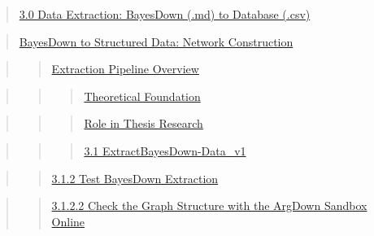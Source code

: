 \documentclass[
  11pt,
  letterpaper,
]{book}
\begin{document}
\begin{quote}
\hyperref[scrollTo=vUSS00TCEpeW]{3.0 Data Extraction: BayesDown (.md) to
Database (.csv)}
\end{quote}

\begin{quote}
\hyperref[scrollTo=vUSS00TCEpeW]{BayesDown to Structured Data: Network
Construction}
\end{quote}

\begin{quote}
\begin{quote}
\hyperref[scrollTo=vUSS00TCEpeW]{Extraction Pipeline Overview}
\end{quote}
\end{quote}

\begin{quote}
\begin{quote}
\begin{quote}
\hyperref[scrollTo=vUSS00TCEpeW]{Theoretical Foundation}
\end{quote}
\end{quote}
\end{quote}

\begin{quote}
\begin{quote}
\begin{quote}
\hyperref[scrollTo=vUSS00TCEpeW]{Role in Thesis Research}
\end{quote}
\end{quote}
\end{quote}

\begin{quote}
\begin{quote}
\begin{quote}
\hyperref[scrollTo=AFnu_1Ludahi]{3.1 ExtractBayesDown-Data\_v1}
\end{quote}
\end{quote}
\end{quote}

\begin{quote}
\begin{quote}
\hyperref[scrollTo=eUBJh8Qp4yd4]{3.1.2 Test BayesDown Extraction}
\end{quote}
\end{quote}

\begin{quote}
\begin{quote}
\hyperref[scrollTo=z4Hgs0ICDQyW]{3.1.2.2 Check the Graph Structure with
the ArgDown Sandbox Online}
\end{quote}
\end{quote}
\end{document}

